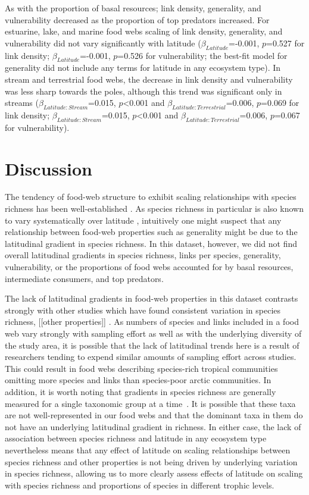 \documentclass[12pt]{article}
\begin{document}
As with the proportion of basal resources; link density, generality, and
vulnerability decreased as the proportion of top predators increased. For
estuarine, lake, and marine food webs scaling of link density, generality, and
vulnerability did not vary significantly with latitude
($\beta_{Latitude}$=-0.001, $p$=0.527 for link density;
$\beta_{Latitude}$=-0.001, $p$=0.526 for vulnerability; the best-fit model for
generality did not include any terms for latitude in any ecosystem type). In
stream and terrestrial food webs, the decrease in link density and
vulnerability was less sharp towards the poles, although this trend was
significant only in streams ($\beta_{Latitude:Stream}$=0.015,
$p$\textless0.001 and $\beta_{Latitude:Terrestrial}$=0.006, $p$=0.069 for link
density; $\beta_{Latitude:Stream}$=0.015, $p$\textless0.001 and
$\beta_{Latitude:Terrestrial}$=0.006, $p$=0.067 for vulnerability).



\section*{Discussion}

The tendency of food-web structure to exhibit scaling relationships with
species richness has been well-established \citep{Dunne2004,Riede2010}. As
species richness in particular is also known to vary systematically over
latitude \citep{}, intuitively one might suspect that any relationship
between food-web properties such as generality might be due to the latitudinal
gradient in species richness. In this dataset, however, we did not find
overall latitudinal gradients in species richness, links per species, 
generality, vulnerability, or the proportions of food webs accounted for by 
basal resources, intermediate consumers, and top predators. 


The lack of latitudinal gradients in food-web properties in this dataset contrasts
strongly with other studies which have found consistent variation in species richness,
[[other properties]] \citep{}. As numbers of species and links included in a food web
vary strongly with sampling effort as well as with the underlying diversity of the study
area, it is possible that the lack of latitudinal trends here is a result of researchers
tending to expend similar amounts of sampling effort across studies. This could result in
food webs describing species-rich tropical communities omitting more species and links
than species-poor arctic communities. In addition, it is worth noting that gradients in
species richness are generally measured for a single taxonomic group at a time~\citep{}.
It is possible that these taxa are not well-represented in our food webs and that the
dominant taxa in them do not have an underlying latitudinal gradient in richness. In
either case, the lack of association between species richness
and latitude in any ecosystem type nevertheless means that any effect of latitude on scaling relationships
between species richness and other properties is not being driven by underlying variation in
species richness, allowing us to more clearly assess effects of latitude on scaling with 
species richness and proportions of species in different trophic levels.
\end{document}
